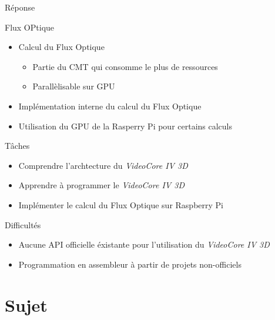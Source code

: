 \documentclass{bredelebeamer}
\begin{document}
\begin{frame}{Réponse}
\begin{block}{Flux OPtique}
\begin{itemize}
\item Calcul du Flux Optique
\begin{itemize}
	\item Partie du CMT qui consomme le plus de ressources
	\item Parallèlisable sur GPU
\end{itemize}
\item Implémentation interne du calcul du Flux Optique
\item Utilisation du GPU de la Rasperry Pi pour certains calculs
\end{itemize}
\end{block}

\begin{exampleblock}{Tâches}
\begin{itemize}
	\item Comprendre l'archtecture du \emph{VideoCore IV 3D}
	\item Apprendre à programmer le \emph{VideoCore IV 3D}
\item Implémenter le calcul du Flux Optique sur Raspberry Pi
\end{itemize}
\end{exampleblock}

\begin{alertblock}{Difficultés}
\begin{itemize}
	\item Aucune API officielle éxistante pour l'utilisation du \emph{VideoCore IV 3D}
\item Programmation en assembleur à partir de projets non-officiels
\end{itemize}
\end{alertblock}

\end{frame}





\section{Sujet}
\end{document}
